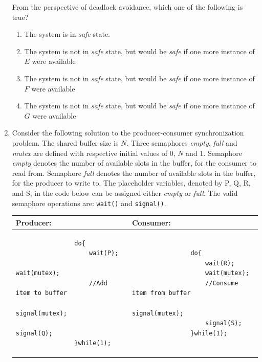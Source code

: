 \documentclass[journal,12pt,onecolumn]{IEEEtran}
\theoremstyle{remark}
\begin{document}
\begin{enumerate}
From the perspective of deadlock avoidance, which one of the following is true?

\hfill{}

\begin{enumerate}
	\item The system is in \textit{safe} state.
	\item The system is not in \textit{safe} state, but would be \textit{safe} if one more instance of $E$ were available
	\item The system is not in \textit{safe} state, but would be \textit{safe} if one more instance of $F$ were available
	\item The system is not in \textit{safe} state, but would be \textit{safe} if one more instance of $G$ were available
\end{enumerate}

\item Consider the following solution to the producer-consumer synchronization problem. The shared buffer size is $N$. Three semaphores \textit{empty}, \textit{full} and \textit{mutex} are defined with respective initial values of $0$, $N$ and $1$. Semaphore \textit{empty} denotes the number of available slots in the buffer, for the consumer to read from. Semaphore \textit{full} denotes the number of available slots in the buffer, for the producer to write to. The placeholder variables, denoted by P, Q, R, and S, in the code below can be assigned either \textit{empty} or \textit{full}. The valid semaphore operations are: \texttt{wait()} and \texttt{signal()}.

\begin{center}
	\begin{tabular}{|l|l|}
		\hline
		\textbf{Producer:} & \textbf{Consumer:} \\ \hline
		\begin{minipage}{0.4\textwidth}
			\begin{verbatim}
				do{
					wait(P);
					wait(mutex);
					//Add item to buffer
					signal(mutex);
					signal(Q);
				}while(1);
			\end{verbatim}
		\end{minipage}
		& 
		\begin{minipage}{0.4\textwidth}
			\begin{verbatim}
				do{
					wait(R);
					wait(mutex);
					//Consume item from buffer
					signal(mutex);
					signal(S);
				}while(1);
			\end{verbatim}
		\end{minipage} 
		\\ \hline
	\end{tabular}
\end{center}


\end{enumerate}
\end{document}
